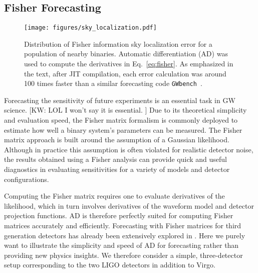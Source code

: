 \documentclass[twocolumn]{aastex631}
\newcommand{\kw}[1]{{\color{rb4}[KW: #1 ]}}
\begin{document}
\subsection{Fisher Forecasting}
\label{subsec:fisher}

\begin{figure}[t!]
    \centering
    \texttt{[image: figures/sky\_localization.pdf]}
    \caption{
        Distribution of Fisher information sky localization error for a population of nearby binaries.
        Automatic differentiation (AD) was used to compute the derivatives in Eq.~\ref{eq:fisher}.
        As emphasized in the text, after JIT compilation, each error calculation was around 100 times faster than a similar forecasting code \texttt{GWbench}~\citep{Borhanian:2020ypi}.
    }
    \label{fig:sky_localization}
\end{figure}

Forecasting the sensitivity of future experiments is an essential task in GW science. \kw{LOL I won't say it is essential.}
Due to its theoretical simplicity and evaluation speed, the Fisher matrix formalism is commonly deployed to estimate how well a binary system's parameters can be measured.
The Fisher matrix approach is built around the assumption of a Gaussian likelihood.
Although in practice this assumption is often violated for realistic detector noise, the results obtained using a Fisher analysis can provide quick and useful diagnostics in evaluating sensitivities for a variety of models and detector configurations.

Computing the Fisher matrix requires one to evaluate derivatives of the likelihood, which in turn involves derivatives of the waveform model and detector projection functions.
AD is therefore perfectly suited for computing Fisher matrices accurately and efficiently. 
Forecasting with Fisher matrices for third generation detectors has already been extensively explored in \citep{Iacovelli:2022bbs, Iacovelli:2022mbg}.
Here we purely want to illustrate the simplicity and speed of AD for forecasting rather than providing new physics insights.
We therefore consider a simple, three-detector setup corresponding to the two LIGO detectors in addition to Virgo.
\end{document}
